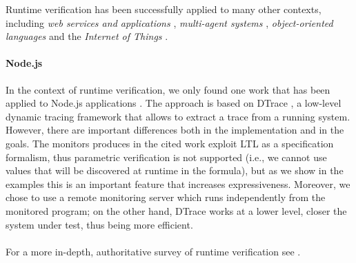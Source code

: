 Runtime verification has been successfully applied to many other contexts, including \emph{web services and applications} \cite{webservices, webapps}, \emph{multi-agent systems} \cite{AnconaDM12}, \emph{object-oriented languages} \cite{pql, javadynamic, de2014combining, BoerEtAl14} and the \emph{Internet of Things} \cite{rviot1, rviot2}.

\paragraph{Node.js}
In the context of runtime verification, we only found one work that has been applied to Node.js applications \cite{Rosenberg2016}.
The approach is based on DTrace \cite{dtrace}, a low-level dynamic tracing framework that allows to extract a trace from a running system.
However, there are important differences both in the implementation and in the goals.
The monitors produces in the cited work exploit LTL \cite{ltl} as a specification formalism, thus parametric verification is not supported (i.e., we cannot use values that will be discovered at runtime in the formula), but as we show in the examples this is an important feature that increases expressiveness.
Moreover, we chose to use a remote monitoring server which runs independently from the monitored program; on the other hand, DTrace works at a lower level, closer the system under test, thus being more efficient.

\paragraph*{}
For a more in-depth, authoritative survey of runtime verification see \cite{rv}.
